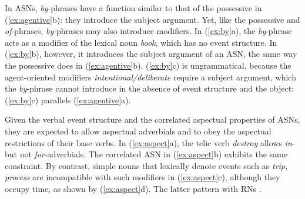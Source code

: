 \documentclass[output=paper]{langsci/langscibook}
\begin{document}
\begin{exe}
\end{exe}

 In ASNs, \textit{by}-phrases have a function similar to that of the possessive in (\ref{ex:agentive}b): they introduce the subject argument. Yet, like the possessive and \textit{of}-phrases, \textit{by}-phrases may also introduce modifiers. In (\ref{ex:by}a), the \textit{by}-phrase acts as a modifier of the lexical noun \textit{book}, which has no event structure. In (\ref{ex:by}b), however, it introduces the subject argument of an ASN, the same way the possessive does in (\ref{ex:agentive}b). (\ref{ex:by}c) is ungrammatical, because the agent-oriented modifiers \textit{intentional/deliberate} require a subject argument, which the \textit{by}-phrase cannot introduce in the absence of event structure and the object: (\ref{ex:by}c) parallels (\ref{ex:agentive}a).

\begin{exe}
\end{exe}

 {Given the verbal event structure and the correlated aspectual properties of ASNs, they are expected to allow aspectual adverbials and to obey the aspectual restrictions of their base verbs. In (\ref{ex:aspect}a), the telic verb \textit{destroy} allows \textit{in}- but not \textit{for}-adverbials. The correlated ASN in (\ref{ex:aspect}b) exhibits the same constraint. By contrast,  simple nouns that lexically denote events such as \textit{trip, process} are incompatible with such modifiers in (\ref{ex:aspect}c), although they occupy time, as shown by (\ref{ex:aspect}d). The latter pattern with RNs \parencite[58--59]{grimshaw:90}.}

\begin{exe}
\end{exe}
\end{document}
